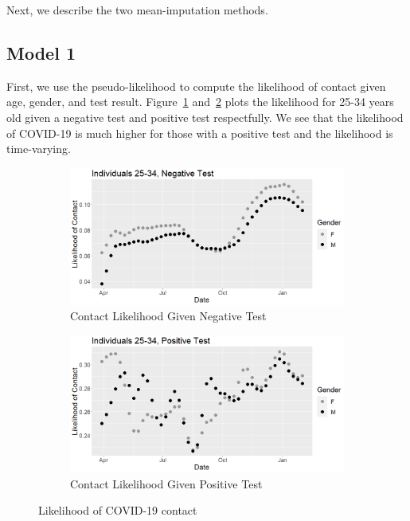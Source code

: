 \documentclass[12pt]{amsart}
\numberwithin{equation}{section}
\theoremstyle{plain}
\begin{document}
Next, we describe the two mean-imputation methods.
\subsection{Model 1}

First, we use the pseudo-likelihood to compute the likelihood of contact given age, gender, and test result.  Figure~\ref{fig:contactlik1} and~\ref{fig:contactlik2} plots the likelihood for 25-34 years old given a negative test and positive test respectfully.  We see that the likelihood of COVID-19 is much higher for those with a positive test and the likelihood is time-varying.

\begin{figure}[!th]
\centering
\begin{subfigure}{.5\textwidth}
 \centering
 \includegraphics[width=.9\linewidth]{../figs/tvprop_contact_fig1.png}
 \caption{Contact Likelihood Given Negative Test}
 \label{fig:contactlik1}
\end{subfigure}%
\begin{subfigure}{.5\textwidth}
 \centering
\includegraphics[width=.9\linewidth]{../figs/tvprop_contact_fig2.png}
 \caption{Contact Likelihood Given Positive Test}
 \label{fig:contactlik2}
\end{subfigure}
\caption{Likelihood of COVID-19 contact}
\label{fig:contactlik}
\end{figure}
\end{document}
